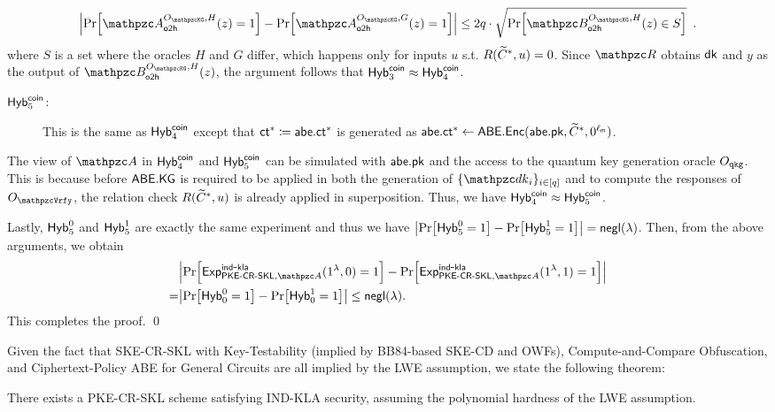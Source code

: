 \begin{align}
\abs{\Pr[\qA_\oh^{\Oracle{\qKG},
H}(z)=1]-\Pr[\qA_\oh^{\Oracle{\qKG}, G}(z)=1]} \leq
2q\cdot\sqrt{\Pr[\qB_\oh^{\Oracle{\qKG}, H}(z)\in S]}
\enspace.
\end{align}
where $S$ is a set where
the oracles $H$ and $G$ differ, which happens only for inputs $u$ s.t.
$R(\widetilde{C}^*, u) = 0$. Since $\qR$ obtains $\mathsf{dk}$ and $y$ as the
output of $\qB_\oh^{\Oracle{\qKG},H}(z)$, the argument
follows that $\mathsf{Hyb}_3^{\mathsf{coin}} \approx \mathsf{Hyb}_4^{\mathsf{coin}}$.

\begin{description}
\item[$\mathsf{Hyb}_{5}^{\mathsf{coin}}$:]This is the same as $\mathsf{Hyb}_{4}^{\mathsf{coin}}$ except that $\mathsf{ct}^*\coloneqq\mathsf{abe}.\mathsf{ct}^*$ is generated as $\mathsf{abe}.\mathsf{ct}^*\leftarrow\mathsf{ABE}.\mathsf{Enc}(\mathsf{abe}.\mathsf{pk},\widetilde{C}^*,0^{\ell_{\mathsf{m}}})$.
\end{description}

The view of $\qA$ in $\mathsf{Hyb}_{4}^{\mathsf{coin}}$ and $\mathsf{Hyb}_{5}^{\mathsf{coin}}$ can be
simulated with $\mathsf{abe}.\mathsf{pk}$ and the access to the quantum key
generation oracle $O_{\mathtt{qkg}}$. This is because before $\mathsf{ABE}.\mathsf{KG}$
is required to be applied in both the generation of $\{\qdk_i\}_{i
\in [q]}$ and to compute the responses of $\Oracle{\qVrfy}$, the
relation check $R(\widetilde{C}^*, u)$ is already applied in
superposition. Thus, we have $\mathsf{Hyb}_4^{\mathsf{coin}} \approx \mathsf{Hyb}_5^{\mathsf{coin}}$.

Lastly, $\mathsf{Hyb}_{5}^{0}$ and $\mathsf{Hyb}_{5}^{1}$ are exactly the same experiment and thus we have $\abs{\Pr[\mathsf{Hyb}_{5}^0=1]-\Pr[\mathsf{Hyb}_{5}^1=1]}={\mathsf{negl}}(\lambda)$.
Then, from the above arguments, we obtain
\begin{align}
   & \abs{\Pr[\expb{\PKECRSKL,\qA}{ind}{kla}(1^\secp,0)=1]-\Pr[\expb{\PKECRSKL,\qA}{ind}{kla}(1^\secp,1)=1]}\\
=&\abs{\Pr[\hybi{0}^0=1]-\Pr[\hybi{0}^1=1]}\le\negl(\secp).
\end{align}
This completes the proof. \qed

Given the fact that SKE-CR-SKL with Key-Testability (implied by
BB84-based SKE-CD and OWFs), Compute-and-Compare Obfuscation, and
Ciphertext-Policy ABE for General Circuits are all implied by the
LWE assumption, we state the following theorem:

\begin{theorem}
There exists a PKE-CR-SKL scheme satisfying IND-KLA security,
assuming the polynomial hardness of the LWE assumption.
\end{theorem}

